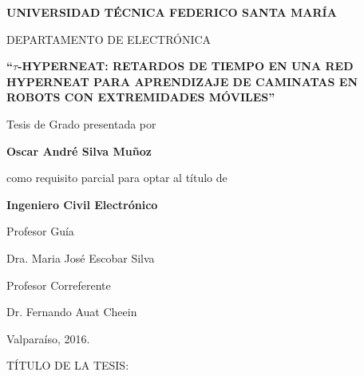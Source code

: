 \pagestyle{empty}

\begin{center}

\large \textbf{UNIVERSIDAD T\'ECNICA FEDERICO SANTA MAR\'IA}

\vspace{3mm}

\normalsize DEPARTAMENTO DE ELECTR\'ONICA

\vspace{40mm}

\Large {\bf ``\(\tau\)-HYPERNEAT: RETARDOS DE TIEMPO EN UNA RED HYPERNEAT PARA APRENDIZAJE DE CAMINATAS EN ROBOTS CON EXTREMIDADES M\'OVILES''\\}

\vspace{32mm}

\normalsize
Tesis de Grado presentada por

\vspace{2mm}

\large \textbf{Oscar Andr\'e Silva Mu\~noz}

\vspace{10mm}

\normalsize
como requisito parcial para optar al t\'itulo de

\vspace{2mm}

\textbf{Ingeniero Civil Electr\'onico}

\vspace{5mm}

Profesor Gu\'ia


Dra. Maria Jos\'e Escobar Silva

\vspace{5mm}

Profesor Correferente

\vspace{2mm}

Dr. Fernando Auat Cheein

\vspace{10mm}

Valpara\'iso, 2016.


\end{center}

\cleardoublepage

\vspace{5mm}

\noindent T\'ITULO DE LA TESIS:

\vspace{5mm}

